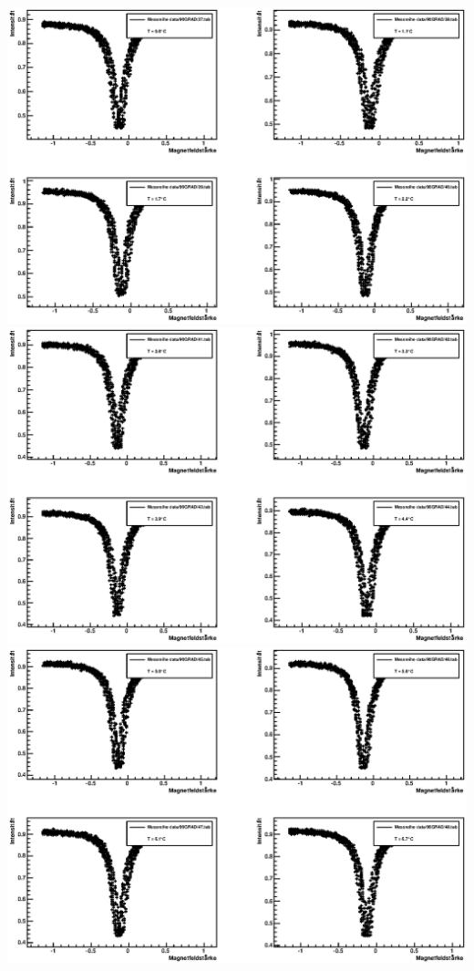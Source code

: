 \documentclass[12pt]{article}
\begin{document}
\includegraphics[width=1\linewidth]{pictures/6.eps} \\
\includegraphics[width=1\linewidth]{pictures/7.eps} \\
\includegraphics[width=1\linewidth]{pictures/8.eps} \\
\end{document}
